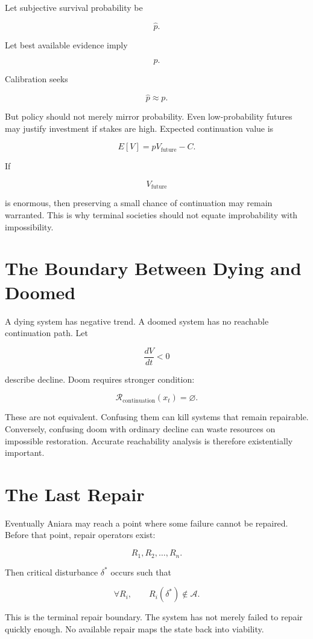\documentclass[11pt,oneside]{book}
\theoremstyle{definition}
\theoremstyle{remark}
\newcommand{\A}{\mathcal{A}}
\newcommand{\R}{\mathcal{R}}
\begin{document}
Let subjective survival probability be

\[
\hat p.
\]

Let best available evidence imply

\[
p.
\]

Calibration seeks

\[
\hat p\approx p.
\]

But policy should not merely mirror probability. Even low-probability futures may justify investment
if stakes are high. Expected continuation value is

\[
E[V] = pV_{\mathrm{future}}-C.
\]

If

\[
V_{\mathrm{future}}
\]

is enormous, then preserving a small chance of continuation may remain warranted. This is why
terminal societies should not equate improbability with impossibility.

\section{The Boundary Between Dying and Doomed}

A dying system has negative trend. A doomed system has no reachable continuation path. Let

\[
\frac{dV}{dt}<0
\]

describe decline. Doom requires stronger condition:

\[
\R_{\mathrm{continuation}}(x_t)=\varnothing.
\]

These are not equivalent. Confusing them can kill systems that remain repairable. Conversely,
confusing doom with ordinary decline can waste resources on impossible restoration. Accurate
reachability analysis is therefore existentially important.

\section{The Last Repair}

Eventually Aniara may reach a point where some failure cannot be repaired. Before that point, repair
operators exist:

\[
R_1,R_2,\ldots,R_n.
\]

Then critical disturbance \(\delta^\ast\) occurs such that

\[
\forall R_i, \qquad R_i(\delta^\ast) \notin\A.
\]

This is the terminal repair boundary. The system has not merely failed to repair quickly enough. No
available repair maps the state back into viability.
\end{document}
